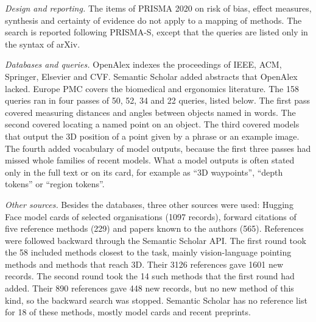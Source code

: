\emph{Design and reporting.}
The items of PRISMA 2020 on risk of bias, effect measures, synthesis and certainty of evidence do not apply to a mapping of methods.
The search is reported following PRISMA-S, except that the queries are listed only in the syntax of arXiv.

\emph{Databases and queries.}
OpenAlex indexes the proceedings of IEEE, ACM, Springer, Elsevier and CVF.
Semantic Scholar added abstracts that OpenAlex lacked.
Europe PMC covers the biomedical and ergonomics literature.
The 158 queries ran in four passes of 50, 52, 34 and 22 queries, listed below.
The first pass covered measuring distances and angles between objects named in words.
The second covered locating a named point on an object.
The third covered models that output the 3D position of a point given by a phrase or an example image.
The fourth added vocabulary of model outputs, because the first three passes had missed whole families of recent models.
What a model outputs is often stated only in the full text or on its card, for example as ``3D waypoints'', ``depth tokens'' or ``region tokens''.

\emph{Other sources.}
Besides the databases, three other sources were used: Hugging Face model cards of selected organisations (1097 records), forward citations of five reference methods (229) and papers known to the authors (565).
References were followed backward through the Semantic Scholar API.
The first round took the 58 included methods closest to the task, mainly vision-language pointing methods and methods that reach 3D.
Their 3126 references gave 1601 new records.
The second round took the 14 such methods that the first round had added.
Their 890 references gave 448 new records, but no new method of this kind, so the backward search was stopped.
Semantic Scholar has no reference list for 18 of these methods, mostly model cards and recent preprints.

